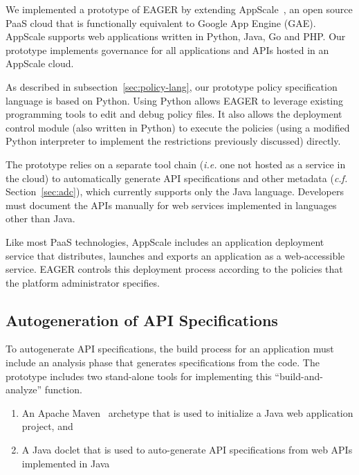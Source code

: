 We implemented a prototype of EAGER by extending AppScale~\cite{appscale13}, 
an open source PaaS cloud that is 
functionally equivalent to Google App Engine (GAE).  AppScale supports
web applications written in Python, Java, Go and PHP. Our prototype
implements governance for all applications and APIs hosted in an AppScale cloud. 

As described in subsection~\ref{sec:policy-lang}, 
our prototype policy specification
language is based on Python.
Using Python allows EAGER to leverage
existing programming tools to edit and debug policy files. 
It also allows the deployment control module (also written in Python) to
execute the policies (using a modified Python interpreter to implement the
restrictions previously discussed) directly.


The prototype relies on a separate tool chain ({\em i.e.} one not hosted as a
service in the cloud) to automatically generate
API specifications and other metadata ({\em c.f.} Section~\ref{sec:adc}), which
currently supports only the Java language.  
Developers must document the APIs manually
for web services implemented in languages other than Java.

Like most PaaS technologies, AppScale includes an application deployment
service that distributes, launches and exports an application
as a web-accessible service.  EAGER controls this deployment
process according to the policies that the platform administrator specifies.

\subsection{Autogeneration of API Specifications}
To autogenerate API specifications, the build process for an application must
include an analysis phase that generates specifications from the code.
The prototype includes two stand-alone tools for implementing this
``build-and-analyze'' function.
\begin{enumerate}
\vspace{0.05in}
\item An Apache Maven~\cite{maven} archetype that is used to initialize a Java
web application project, and 
\vspace{0.05in}
\item A Java doclet that is used to auto-generate API specifications from web APIs implemented in Java
\vspace{0.05in}
\end{enumerate}


